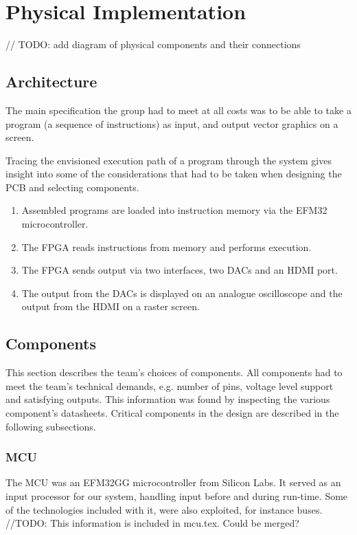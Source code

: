 \chapter{Physical Implementation}

// TODO: add diagram of physical components and their connections

\section{Architecture}
The main specification the group had to meet at all costs was to be able to take a program (a sequence of instructions) as input, and output vector graphics on a screen.

Tracing the envisioned execution path of a program through the system gives insight into some of the considerations that had to be taken when designing the PCB and selecting components.

\begin{enumerate}
\item Assembled \vthreek programs are loaded into instruction memory via the EFM32 microcontroller.
\item The FPGA reads instructions from memory and performs execution.
\item The FPGA sends output via two interfaces, two DACs and an HDMI port.
\item The output from the DACs is displayed on an analogue oscilloscope and the output from the HDMI on a raster screen.
\end{enumerate}

\section{Components}
This section describes the team's choices of components.
All components had to meet the team's technical demands, e.g. number of pins, voltage level support and satisfying outputs.
This information was found by inspecting the various component's datasheets.
Critical components in the design are described in the following subsections.

\subsection{MCU}
The MCU was an EFM32GG microcontroller from Silicon Labs. 
It served as an input processor for our system, handling input before and during run-time. 
Some of the technologies included with it, were also exploited, for instance buses. 
//TODO: This information is included in mcu.tex. Could be merged?

